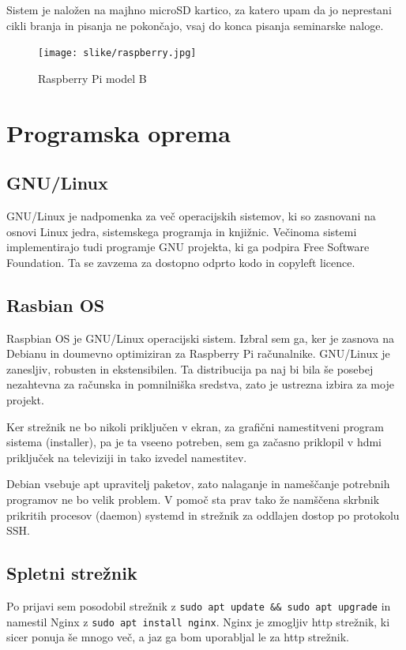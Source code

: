 \documentclass[12pt, a4paper]{article}
\begin{document}
Sistem je naložen na majhno microSD kartico, za katero upam da jo neprestani cikli branja in pisanja ne pokončajo, vsaj do konca pisanja seminarske naloge.
\begin{figure}[h]
	\centering
	\texttt{[image: slike/raspberry.jpg]}
	\caption{Raspberry Pi model B}
	\label{fig:raspberry}
\end{figure}

\section{Programska oprema}
\subsection{GNU/Linux}
GNU/Linux je nadpomenka za več operacijskih sistemov, ki so zasnovani na osnovi Linux jedra, sistemskega programja in knjižnic.
Večinoma sistemi implementirajo tudi programje GNU projekta, ki ga podpira Free Software Foundation.
Ta se zavzema za dostopno odprto kodo in copyleft licence.\cite{gnu} 
\subsection{Rasbian OS}
Raspbian OS je GNU/Linux operacijski sistem. Izbral sem ga, ker je zasnova na Debianu in doumevno optimiziran za Raspberry Pi računalnike.
GNU/Linux je zanesljiv, robusten in ekstensibilen.
Ta distribucija pa naj bi bila še posebej nezahtevna za računska in pomnilniška sredstva\cite{raspbian}, zato je ustrezna izbira za moje projekt.

Ker strežnik ne bo nikoli priključen v ekran, za grafični namestitveni program sistema (installer), pa je ta vseeno potreben, sem ga začasno priklopil v hdmi priključek na televiziji in tako izvedel namestitev.

Debian vsebuje apt upravitelj paketov, zato nalaganje in nameščanje potrebnih programov ne bo velik problem.
V pomoč sta prav tako že namščena skrbnik prikritih procesov (daemon) systemd in strežnik za oddlajen dostop po protokolu SSH. 

\subsection{Spletni strežnik}
Po prijavi sem posodobil strežnik z \verb|sudo apt update && sudo apt upgrade| in namestil Nginx z \verb|sudo apt install nginx|.
Nginx je zmogljiv http strežnik, ki sicer ponuja še mnogo več, a jaz ga bom uporabljal le za http strežnik.\cite{nginx}
\end{document}
